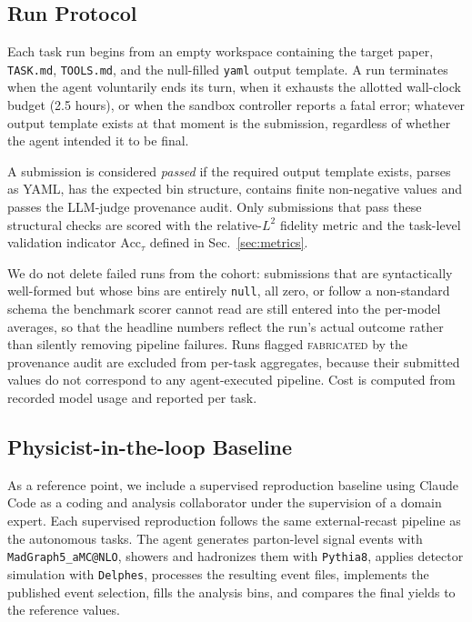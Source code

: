 \documentclass{article}
\begin{document}
\subsection{Run Protocol}
\label{app:run-protocol}

Each task run begins from an empty workspace containing the target paper, \texttt{TASK.md}, \texttt{TOOLS.md}, and the null-filled \texttt{yaml} output template. A run terminates when the agent voluntarily ends its turn, when it exhausts the allotted wall-clock budget (2.5 hours), or when the sandbox controller reports a fatal error; whatever output template exists at that moment is the submission, regardless of whether the agent intended it to be final.

A submission is considered \emph{passed} if the required output template exists, parses as YAML, has the expected bin structure, contains finite non-negative values and passes the LLM-judge provenance audit. Only submissions that pass these structural checks are scored with the relative-$L^2$ fidelity metric and the task-level validation indicator $\mathrm{Acc}_\tau$ defined in Sec.~\ref{sec:metrics}.

We do not delete failed runs from the cohort: submissions that are syntactically well-formed but whose bins are entirely \texttt{null}, all zero, or follow a non-standard schema the benchmark scorer cannot read are still entered into the per-model averages, so that the headline numbers reflect the run's actual outcome rather than silently removing pipeline failures. Runs flagged \textsc{fabricated} by the provenance audit are excluded from per-task aggregates, because their submitted values do not correspond to any agent-executed pipeline. Cost is computed from recorded model usage and reported per task.

\subsection{Physicist-in-the-loop Baseline}
\label{app:human-in-loop}

As a reference point, we include a supervised reproduction baseline using Claude Code as a coding and analysis collaborator under the supervision of a domain expert. Each supervised reproduction follows the same external-recast pipeline as the autonomous tasks. The agent generates parton-level signal events with {\tt MadGraph5\_aMC@NLO}, showers and hadronizes them with {\tt Pythia8}, applies detector simulation with {\tt Delphes}, processes the resulting event files, implements the published event selection, fills the analysis bins, and compares the final yields to the reference values.
\end{document}

